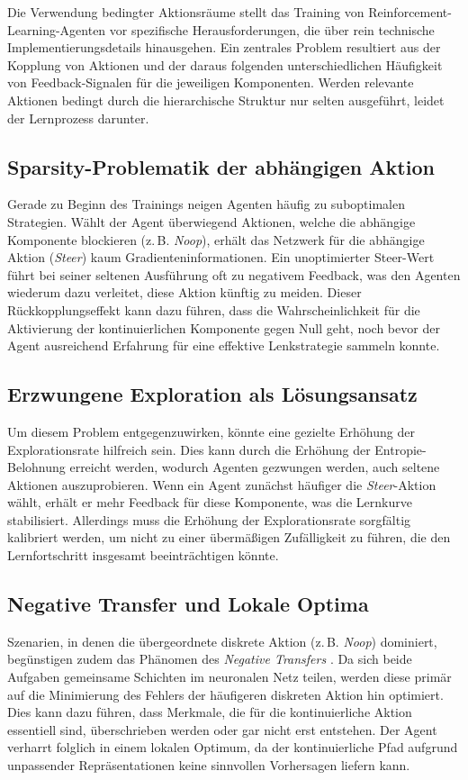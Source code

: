 Die Verwendung bedingter Aktionsräume stellt das Training von Reinforcement\hyp{}Learning\hyp{}Agenten vor spezifische Herausforderungen, die über rein technische Implementierungsdetails hinausgehen. Ein zentrales Problem resultiert aus der Kopplung von Aktionen und der daraus folgenden unterschiedlichen Häufigkeit von Feedback\hyp{}Signalen für die jeweiligen Komponenten. Werden relevante Aktionen bedingt durch die hierarchische Struktur nur selten ausgeführt, leidet der Lernprozess darunter.

\subsection{Sparsity\hyp{}Problematik der abhängigen Aktion}
Gerade zu Beginn des Trainings neigen Agenten häufig zu suboptimalen Strategien. Wählt der Agent überwiegend Aktionen, welche die abhängige Komponente blockieren (z.\,B. \emph{Noop}), erhält das Netzwerk für die abhängige Aktion (\emph{Steer}) kaum Gradienteninformationen. Ein unoptimierter Steer\hyp{}Wert führt bei seiner seltenen Ausführung oft zu negativem Feedback, was den Agenten wiederum dazu verleitet, diese Aktion künftig zu meiden. Dieser Rückkopplungseffekt kann dazu führen, dass die Wahrscheinlichkeit für die Aktivierung der kontinuierlichen Komponente gegen Null geht, noch bevor der Agent ausreichend Erfahrung für eine effektive Lenkstrategie sammeln konnte.

\subsection*{Erzwungene Exploration als Lösungsansatz}
Um diesem Problem entgegenzuwirken, könnte eine gezielte Erhöhung der Explorationsrate hilfreich sein. Dies kann durch die Erhöhung der Entropie-Belohnung erreicht werden, wodurch Agenten gezwungen werden, auch seltene Aktionen auszuprobieren. Wenn ein Agent zunächst häufiger die \emph{Steer}\hyp{}Aktion wählt, erhält er mehr Feedback für diese Komponente, was die Lernkurve stabilisiert. Allerdings muss die Erhöhung der Explorationsrate sorgfältig kalibriert werden, um nicht zu einer übermäßigen Zufälligkeit zu führen, die den Lernfortschritt insgesamt beeinträchtigen könnte.

\subsection{Negative Transfer und Lokale Optima}
Szenarien, in denen die übergeordnete diskrete Aktion (z.\,B. \emph{Noop}) dominiert, begünstigen zudem das Phänomen des \textit{Negative Transfers} \cite{Liu_Liang_Gitter_2019}. Da sich beide Aufgaben gemeinsame Schichten im neuronalen Netz teilen, werden diese primär auf die Minimierung des Fehlers der häufigeren diskreten Aktion hin optimiert. Dies kann dazu führen, dass Merkmale, die für die kontinuierliche Aktion essentiell sind, überschrieben werden oder gar nicht erst entstehen. Der Agent verharrt folglich in einem lokalen Optimum, da der kontinuierliche Pfad aufgrund unpassender Repräsentationen keine sinnvollen Vorhersagen liefern kann.

